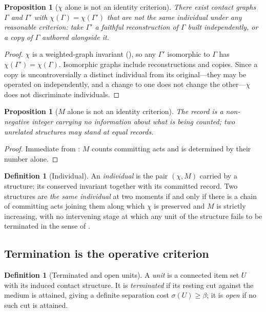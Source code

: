 \documentclass[11pt,twocolumn,a4paper]{article}
\theoremstyle{dirthm}
\newtheorem{proposition}[theorem]{Proposition}
\theoremstyle{definition}
\newtheorem{definition}[theorem]{Definition}
\theoremstyle{remark}
\newcommand{\Gph}{\Gamma}
\newcommand{\flo}{\beta}
\newcommand{\str}{\sigma}
\newcommand{\rec}{M}
\newcommand{\Char}{\chi}
\begin{document}
\begin{proposition}[$\Char$ alone is not an identity criterion]
\label{prop:char-insufficient}
There exist contact graphs $\Gph$ and $\Gph'$ with $\Char(\Gph)=\Char(\Gph')$
that are not the same individual under any reasonable criterion: take
$\Gph'$ a faithful reconstruction of $\Gph$ built independently, or a copy of
$\Gph$ authored alongside it.
\end{proposition}

\begin{proof}
$\Char$ is a weighted-graph invariant (), so any $\Gph'$
isomorphic to $\Gph$ has $\Char(\Gph')=\Char(\Gph)$. Isomorphic graphs
include reconstructions and copies. Since a copy is uncontroversially a
distinct individual from its original---they may be operated on
independently, and a change to one does not change the other---$\Char$ does
not discriminate individuals.
\end{proof}

\begin{proposition}[$\rec$ alone is not an identity criterion]
\label{prop:rec-insufficient}
The record is a non-negative integer carrying no information about what is
being counted; two unrelated structures may stand at equal records.
\end{proposition}

\begin{proof}
Immediate from : $\rec$ counts committing acts and is
determined by their number alone.
\end{proof}

\begin{definition}[Individual]
\label{def:individual}
An \emph{individual} is the pair $(\Char,\rec)$ carried by a structure: its
conserved invariant together with its committed record. Two structures are
\emph{the same individual} at two moments if and only if there is a chain of
committing acts joining them along which $\Char$ is preserved and $\rec$ is
strictly increasing, with no intervening stage at which any unit of the
structure fails to be terminated in the sense of .
\end{definition}

\subsection{Termination is the operative criterion}

\begin{definition}[Terminated and open units]
\label{def:terminated}
A \emph{unit} is a connected item set $U$ with its induced contact structure.
It is \emph{terminated} if its resting cut against the medium is attained,
giving a definite separation cost $\str(U)\ge\flo$; it is \emph{open} if no
such cut is attained.
\end{definition}
\end{document}
